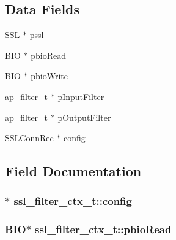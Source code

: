 \subsection*{Data Fields}
\begin{DoxyCompactItemize}
\item 
\hyperlink{group__MOD__SSL_gac05889312301718b3fc106564942ad68}{S\+SL} $\ast$ \hyperlink{structssl__filter__ctx__t_a790a9309cae82f7be6727d3bbae4bcbf}{pssl}
\item 
B\+IO $\ast$ \hyperlink{structssl__filter__ctx__t_ac00e604c25ec7617cfa06f8cdc1ae215}{pbio\+Read}
\item 
B\+IO $\ast$ \hyperlink{structssl__filter__ctx__t_a4e449f415486ddfd7479a71b72eaca2e}{pbio\+Write}
\item 
\hyperlink{structap__filter__t}{ap\+\_\+filter\+\_\+t} $\ast$ \hyperlink{structssl__filter__ctx__t_a80848b379ca25077a682ef33e50e663d}{p\+Input\+Filter}
\item 
\hyperlink{structap__filter__t}{ap\+\_\+filter\+\_\+t} $\ast$ \hyperlink{structssl__filter__ctx__t_acc7e53b50f69ac29a017ed7f4c336691}{p\+Output\+Filter}
\item 
\hyperlink{structSSLConnRec}{S\+S\+L\+Conn\+Rec} $\ast$ \hyperlink{structssl__filter__ctx__t_a32fefb77938fada5528a8b9538a7d234}{config}
\end{DoxyCompactItemize}


\subsection{Field Documentation}
\subsubsection[{\texorpdfstring{config}{config}}]{$\ast$ ssl\+\_\+filter\+\_\+ctx\+\_\+t\+::config}\hypertarget{structssl__filter__ctx__t_a32fefb77938fada5528a8b9538a7d234}{}\label{structssl__filter__ctx__t_a32fefb77938fada5528a8b9538a7d234}
\subsubsection[{\texorpdfstring{pbio\+Read}{pbioRead}}]{\setlength{\rightskip}{0pt plus 5cm}B\+IO$\ast$ ssl\+\_\+filter\+\_\+ctx\+\_\+t\+::pbio\+Read}\hypertarget{structssl__filter__ctx__t_ac00e604c25ec7617cfa06f8cdc1ae215}{}\label{structssl__filter__ctx__t_ac00e604c25ec7617cfa06f8cdc1ae215}
